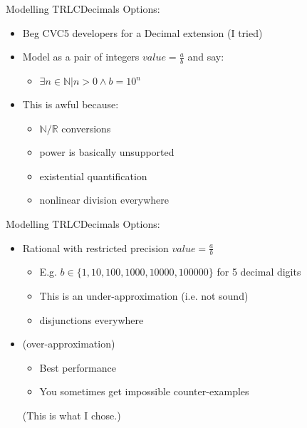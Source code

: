 \documentclass[aspectratio=169]{beamer}
\begin{document}
\begin{frame}{Modelling TRLC}{Decimals}
  Options:
  \begin{itemize}
  \item Beg CVC5 developers for a Decimal extension (I tried)
    \pause
  \item Model as a pair of integers $value = \frac{a}{b}$ and say:
    \begin{itemize}
    \item $\exists n \in \mathbb{N} | n > 0 \land b = 10^n$
    \end{itemize}
    \pause
  \item This is awful because:
    \begin{itemize}
    \item $\mathbb{N} / \mathbb{R}$ conversions
    \item power is basically unsupported
    \item existential quantification
    \item nonlinear division everywhere
    \end{itemize}
  \end{itemize}
\end{frame}

\begin{frame}{Modelling TRLC}{Decimals}
  Options:
  \begin{itemize}
  \item Rational with restricted precision $value = \frac{a}{b}$
    \begin{itemize}
    \item E.g. $b \in \{1, 10, 100, 1000, 10000, 100000\}$ for 5
      decimal digits
    \item This is an under-approximation (i.e. not sound)
    \item disjunctions everywhere
    \end{itemize}
    \pause
  \item {} (over-approximation)
    \begin{itemize}
    \item Best performance
    \item You sometimes get impossible counter-examples
    \end{itemize}
    (This is what I chose.)
  \end{itemize}
\end{frame}
\end{document}
